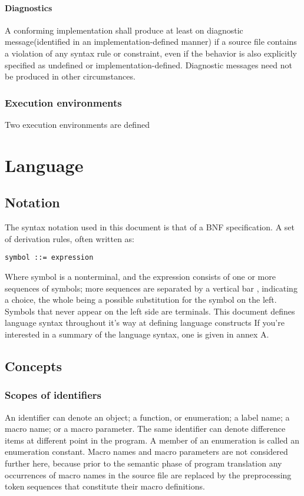 \documentclass{article}
\begin{document}
\paragraph*{Diagnostics}
A conforming implementation shall produce at least on diagnostic message(identified in an
implementation-defined manner) if a source file contains a violation of any syntax rule or
constraint, even if the behavior is also explicitly specified as undefined or
implementation-defined. Diagnostic messages need not be produced in other circumstances.

\subsubsection{Execution environments}
Two execution environments are defined

\section{Language}
\subsection{Notation}
The syntax notation used in this document is that of a BNF specification.  A set of
derivation rules, often written as:
\begin{lstlisting}[language=bnf]
	symbol ::= expression
\end{lstlisting}
Where symbol is a nonterminal, and the expression consists of one or more sequences of
symbols; more sequences are separated by a vertical bar \textbar, indicating a choice,
the whole being a possible substitution for the symbol on the left.  Symbols that never
appear on the left side are terminals.
\linebreak
This document defines language syntax throughout it's way at defining language
constructs If you're interested in a summary of the language syntax, one is given in 
annex A.

\subsection{Concepts}
\subsubsection{Scopes of identifiers}
An identifier can denote an object; a function, or enumeration; a label name; a macro
name; or a macro parameter. The same identifier can denote difference items at different
point in the program. A member of an enumeration is called an enumeration constant.
Macro names and macro parameters are not considered further here, because prior to the
semantic phase of program translation any occurrences of macro names in the source file
are replaced by the preprocessing token sequences that constitute their macro definitions.
\linebreak
\end{document}
